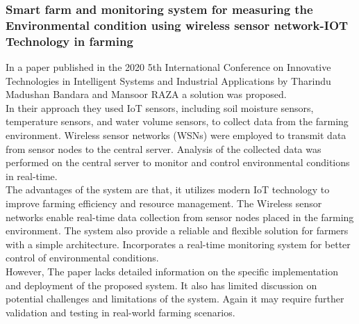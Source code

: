 \documentclass[12pt, a4paper]{article}
\begin{document}
\subsubsection{Smart farm and monitoring system for measuring the Environmental condition using wireless sensor network-IOT Technology in farming}
In a paper published in the 2020 5th International Conference on Innovative Technologies in Intelligent Systems and Industrial Applications by Tharindu Madushan Bandara and Mansoor RAZA\cite{bandara2020smart} a solution was proposed.\\
In their approach they used IoT sensors, including soil moisture sensors, temperature sensors, and
water volume sensors, to collect data from the farming environment.  Wireless sensor networks (WSNs) were employed to transmit data from sensor nodes to the central server. Analysis of the collected data was performed on the central server to monitor and control environmental conditions in real-time.\\
The advantages of the system are that, it utilizes modern IoT technology to improve farming efficiency and resource management. The Wireless sensor networks enable real-time data collection from sensor nodes placed in the farming environment. The system also provide a reliable and flexible solution for farmers with a simple architecture. Incorporates a real-time monitoring system for better control of environmental conditions.\\
However, The paper lacks detailed information on the specific implementation and deployment of the
proposed system. It also has limited discussion on potential challenges and limitations of the system.
Again it may require further validation and testing in real-world farming scenarios.
\end{document}
